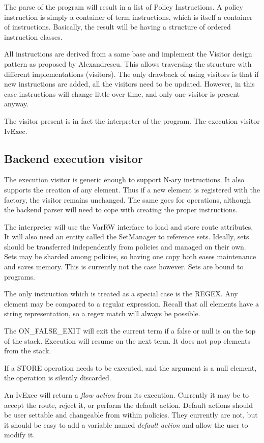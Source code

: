 \documentclass{article}
\begin{document}
The parse of the program will result in a list of Policy Instructions. A policy
instruction is simply a container of term instructions, which is itself a
container of instructions. Basically, the result will be having a structure of
ordered instruction classes.

All instructions are derived from a same base and implement the Visitor design
pattern as proposed by Alexandrescu. This allows traversing the structure with
different implementations (visitors). The only drawback of using visitors is
that if new instructions are added, all the visitors need to be updated.
However, in this case instructions will change little over time, and only one
visitor is present anyway.

The visitor present is in fact the interpreter of the program. The execution
visitor IvExec.

\subsection{Backend execution visitor}
The execution visitor is generic enough to support N-ary instructions. It also
supports the creation of any element. Thus if a new element is registered with
the factory, the visitor remains unchanged. The same goes for operations,
although the backend parser will need to cope with creating the proper
instructions.

The interpreter will use the VarRW interface to load and store route attributes.
It will also need an entity called the SetManager to reference sets. Ideally,
sets should be transferred independently from policies and managed on their own.
Sets may be sharded among policies, so having one copy both eases maintenance
and saves memory. This is currently not the case however. Sets are bound to
programs.

The only instruction which is treated as a special case is the REGEX. Any
element may be compared to a regular expression. Recall that all elements have a
string representation, so a regex match will always be possible.

The ON\_FALSE\_EXIT will exit the current term if a false or null is on the top
of the stack. Execution will resume on the next term. It does not pop elements
from the stack.

If a STORE operation needs to be executed, and the argument is a null element,
the operation is silently discarded.

An IvExec will return a {\em flow action} from its execution. Currently it may
be to accept the route, reject it, or perform the default action. Default
actions should be user settable and changeable from within policies. They
currently are not, but it should be easy to add a variable named {\em default
action} and allow the user to modify it.
\end{document}
